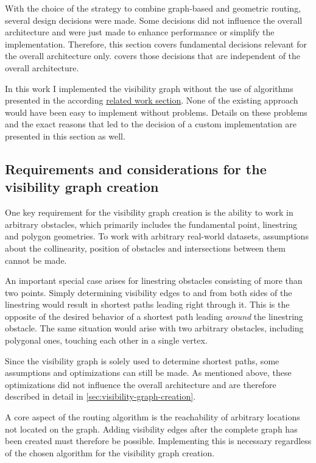 	With the choice of the strategy to combine graph-based and geometric routing, several design decisions were made.
	Some decisions did not influence the overall architecture and were just made to enhance performance or simplify the implementation.
	Therefore, this section covers fundamental decisions relevant for the overall architecture only.
	 covers those decisions that are independent of the overall architecture.
	
	In this work I implemented the visibility graph without the use of algorithms presented in the according \hyperref[subsec:related-work:visibility-graph]{related work section}.
	None of the existing approach would have been easy to implement without problems.
	Details on these problems and the exact reasons that led to the decision of a custom implementation are presented in this section as well.
	
	\subsection{Requirements and considerations for the visibility graph creation}
	
		One key requirement for the visibility graph creation is the ability to work in arbitrary obstacles, which primarily includes the fundamental point, linestring and polygon geometries.
		To work with arbitrary real-world datasets, assumptions about the collinearity, position of obstacles and intersections between them cannot be made.
		
		An important special case arises for linestring obstacles consisting of more than two points.
		Simply determining visibility edges to and from both sides of the linestring would result in shortest paths leading right through it.
		This is the opposite of the desired behavior of a shortest path leading \emph{around} the linestring obstacle.
		The same situation would arise with two arbitrary obstacles, including polygonal ones, touching each other in a single vertex.
		
		Since the visibility graph is solely used to determine shortest paths, some assumptions and optimizations can still be made.
		As mentioned above, these optimizations did not influence the overall architecture and are therefore described in detail in \cref{sec:visibility-graph-creation}.
		
		A core aspect of the routing algorithm is the reachability of arbitrary locations not located on the graph.
		Adding visibility edges after the complete graph has been created must therefore be possible.
		Implementing this is necessary regardless of the chosen algorithm for the visibility graph creation.
		
